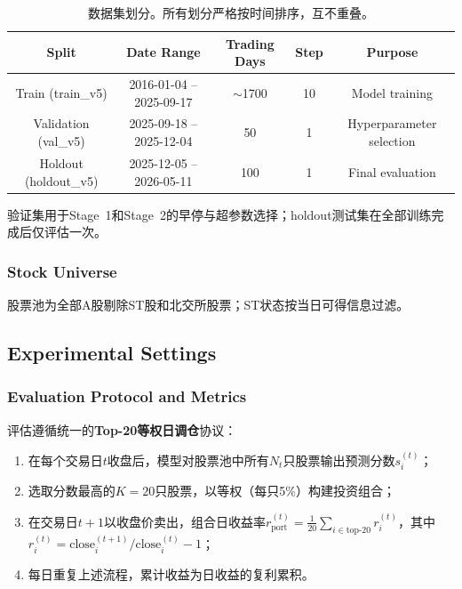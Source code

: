 \begin{table}[H]
\centering
\caption{数据集划分。所有划分严格按时间排序，互不重叠。}
\label{tab:data_split}
\begin{tabular}{@{}ccccc@{}}
\toprule
Split & Date Range & Trading Days & Step & Purpose \\
\midrule
Train (train\_v5)  & 2016-01-04 -- 2025-09-17 & $\sim$1700 & 10 & Model training \\
Validation (val\_v5) & 2025-09-18 -- 2025-12-04 & 50 & 1 & Hyperparameter selection \\
Holdout (holdout\_v5) & 2025-12-05 -- 2026-05-11 & 100 & 1 & Final evaluation \\
\bottomrule
\end{tabular}
\end{table}

验证集用于Stage~1和Stage~2的早停与超参数选择；holdout测试集在全部训练完成后仅评估一次。

\subsubsection{Stock Universe}

股票池为全部A股剔除ST股和北交所股票；ST状态按当日可得信息过滤。

\subsection{Experimental Settings}
\label{sec:exp_settings}

\subsubsection{Evaluation Protocol and Metrics}

评估遵循统一的\textbf{Top-20等权日调仓}协议：

\begin{enumerate}[leftmargin=*, itemsep=2pt]
    \item 在每个交易日$t$收盘后，模型对股票池中所有$N_t$只股票输出预测分数$s_i^{(t)}$；
    \item 选取分数最高的$K=20$只股票，以等权（每只5\%）构建投资组合；
    \item 在交易日$t+1$以收盘价卖出，组合日收益率$r_{\text{port}}^{(t)} = \frac{1}{20}\sum_{i \in \text{top-}20} r_i^{(t)}$，其中$r_i^{(t)} = \text{close}_i^{(t+1)} / \text{close}_i^{(t)} - 1$；
    \item 每日重复上述流程，累计收益为日收益的复利累积。
\end{enumerate}

